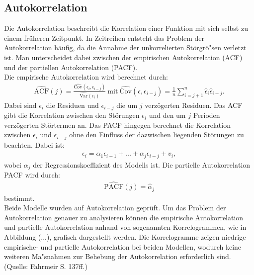 \subsection{Autokorrelation}
Die Autokorrelation beschreibt die Korrelation einer Funktion mit sich selbst zu einem früheren Zeitpunkt. In Zeitreihen entsteht das Problem der Autokorrelation häufig, da die Annahme der unkorrelierten Störgrö"sen verletzt ist. Man unterscheidet dabei zwischen der empirischen Autokorrelation (ACF) und der partiellen Autokorrelation (PACF).\\
Die empirische Autokorrelation wird berechnet durch:
\begin{align}
\widehat{\text{ACF}}(j)=\frac{\widehat{\text{Cov}}(\epsilon_{i},\epsilon_{i-j})}{\widehat{\text{Var}}(\epsilon_{i})} ~\text{mit} ~\widehat{\text{Cov}}(\epsilon,\epsilon_{i-j})=\frac{1}{n}\sum_{i=j+1}^{n}\hat{\epsilon}_{i}\hat{\epsilon}_{i-j}.
\end{align}
Dabei sind $\epsilon_{i}$ die Residuen und $\epsilon_{i-j}$ die um $j$ verzögerten Residuen. Das ACF gibt die Korrelation zwischen den Störungen $\epsilon_{i}$ und den um $j$ Perioden verzögerten Störtermen an. Das PACF hingegen berechnet die Korrelation zwischen $\epsilon_{i}$ und $\epsilon_{i-j}$ ohne den Einfluss der dazwischen liegenden Störungen zu beachten. Dabei ist:
\begin{align}
\epsilon_{i}=\alpha_{1}\epsilon_{i-1}+...+\alpha_{j}\epsilon_{i-j}
+v_{i},
\end{align}
wobei $\alpha_{j}$ der Regressionskoeffizient des Modells ist. Die partielle Autokorrelation PACF wird durch:
\begin{align}
\widehat{\text{PACF}}(j)=\hat{\alpha}_{j}
\end{align}
bestimmt.\\
Beide Modelle wurden auf Autokorrelation geprüft. Um das Problem der Autokorrelation genauer zu analysieren können die empirische Autokorrelation und partielle Autokorrelation anhand von sogenannten Korrelogrammen, wie in Abbildung (...), grafisch dargestellt werden. Die  Korrelogramme zeigen niedrige empirische- und partielle Autokorrelation bei beiden Modellen, wodurch keine weiteren Ma"snahmen zur Behebung der Autokorrelation erforderlich sind.\\
(Quelle: Fahrmeir S. 137ff.)

